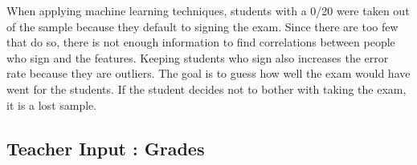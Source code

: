 \documentclass[a4paper,11pt]{report}
\numberwithin{figure}{chapter} %
\begin{document}
    When applying machine learning techniques, students with a 0/20 were taken out of the sample because they default to signing the exam.
    Since there are too few that do so, there is not enough information to find correlations between people who sign and the features.
    Keeping students who sign also increases the error rate because they are outliers.
    The goal is to guess how well the exam would have went for the students.
    If the student decides not to bother with taking the exam, it is a lost sample.\newline

    	\subsection{Teacher Input : Grades}

\end{document}
